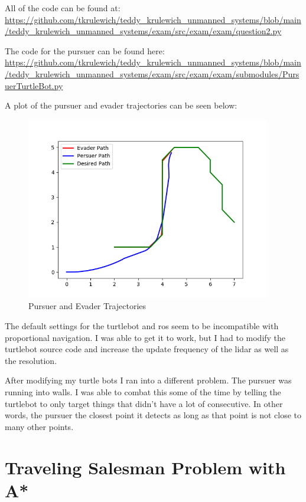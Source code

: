 \documentclass{article}
\begin{document}
\bigskip
\noindent  All of the code can be found at: \\
\url{https://github.com/tkrulewich/teddy_krulewich_unmanned_systems/blob/main/teddy_krulewich_unmanned_systems/exam/src/exam/exam/question2.py}

\bigskip
\noindent The code for the pursuer can be found here: \\
\url{https://github.com/tkrulewich/teddy_krulewich_unmanned_systems/blob/main/teddy_krulewich_unmanned_systems/exam/src/exam/exam/submodules/PursuerTurtleBot.py}

\bigskip
\noindent A plot of the pursuer and evader trajectories can be seen below:

\begin{figure}[h]
\centering
\includegraphics[width=0.95\textwidth]{images/intercept.png}
\caption*{Pursuer and Evader Trajectories}
\end{figure}

\pagebreak
\bigskip
\noindent The default settings for the turtlebot and ros seem to be incompatible with proportional navigation. I was able to get it to work, but I had to modify the turtlebot source code and increase the update frequency of the lidar as well as the resolution.

After modifying my turtle bots I ran into a different problem. The pursuer was running into walls. I was able to combat this some of the time by telling the turtlebot to only target things that didn't have a lot of consecutive. In other words, the pursuer the closest point it detects as long as that point is not close to many other points.

\section{Traveling Salesman Problem with A*}
\end{document}

